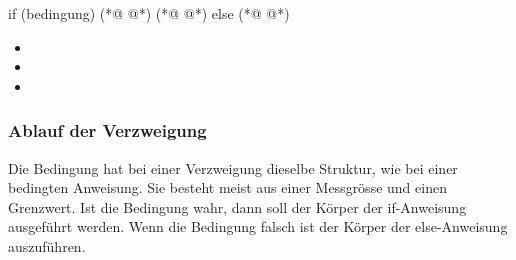 \begin{multicols}{2}
\null\vfill 
\begin{arduinoCode}{}{}
if (bedingung) (*@  @*) 
{       
     (*@  @*)
} 
else {
     (*@  @*)
}
\end{arduinoCode}
\vfill\null 
\columnbreak

\null\vfill
\begin{itemize}
  \itemsep15pt
  
  \item[] 
  \item[] 
  \item[] 
\end{itemize}
\vfill \null

\end{multicols}

\clearpage
\subsubsection{Ablauf der Verzweigung}
Die Bedingung hat bei einer Verzweigung dieselbe Struktur, wie bei einer bedingten Anweisung. Sie besteht meist aus  einer Messgrösse und einen Grenzwert. Ist die Bedingung wahr, dann soll der Körper der if-Anweisung ausgeführt werden. Wenn die Bedingung falsch ist der Körper der else-Anweisung auszuführen.

